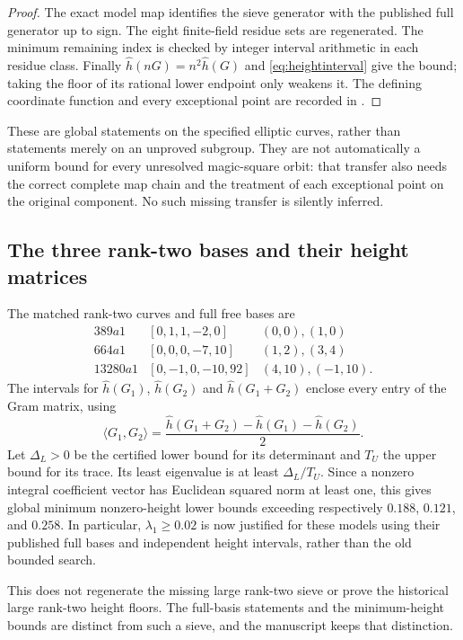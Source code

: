 \documentclass[11pt,letterpaper]{article}
\theoremstyle{definition}\newtheorem{definition}[theorem]{Definition}
\theoremstyle{remark}\newtheorem{remark}[theorem]{Remark}
\begin{document}
\begin{proof}
The exact model map identifies the sieve generator with the published full generator up to sign. The eight finite-field residue sets are regenerated. The minimum remaining index is checked by integer interval arithmetic in each residue class. Finally $\widehat h(nG)=n^2\widehat h(G)$ and \eqref{eq:heightinterval} give the bound; taking the floor of its rational lower endpoint only weakens it. The defining coordinate function and every exceptional point are recorded in .
\end{proof}
These are global statements on the specified elliptic curves, rather than statements merely on an unproved subgroup. They are not automatically a uniform bound for every unresolved magic-square orbit: that transfer also needs the correct complete map chain and the treatment of each exceptional point on the original component. No such missing transfer is silently inferred.

\subsection{The three rank-two bases and their height matrices}
The matched rank-two curves and full free bases are
\[
\begin{array}{c|c|c}
389a1 &[0,1,1,-2,0] &(0,0),(1,0)\\
664a1 &[0,0,0,-7,10] &(1,2),(3,4)\\
13280a1 &[0,-1,0,-10,92] &(4,10),(-1,10).
\end{array}
\]
The intervals for $\widehat h(G_1)$, $\widehat h(G_2)$ and $\widehat h(G_1+G_2)$ enclose every entry of the Gram matrix, using
\[
\langle G_1,G_2\rangle=
\frac{\widehat h(G_1+G_2)-\widehat h(G_1)-\widehat h(G_2)}2.
\]
Let $\Delta_L>0$ be the certified lower bound for its determinant and $T_U$ the upper bound for its trace. Its least eigenvalue is at least $\Delta_L/T_U$. Since a nonzero integral coefficient vector has Euclidean squared norm at least one, this gives global minimum nonzero-height lower bounds exceeding respectively $0.188$, $0.121$, and $0.258$. In particular, $\lambda_1\ge0.02$ is now justified for these models using their published full bases and independent height intervals, rather than the old bounded search.

This does not regenerate the missing large rank-two sieve or prove the historical large rank-two height floors. The full-basis statements and the minimum-height bounds are distinct from such a sieve, and the manuscript keeps that distinction.
\end{document}
